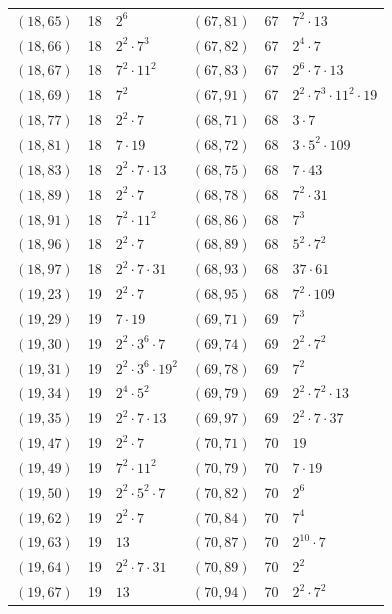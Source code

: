 \documentclass[11pt]{article}
\begin{document}
\begin{longtable}{@{}lrl@{\qquad}lrl@{}}
$(18,65)$ & 18 & $2^{6}$ & $(67,81)$ & 67 & $7^{2}\cdot 13$\\
$(18,66)$ & 18 & $2^{2}\cdot 7^{3}$ & $(67,82)$ & 67 & $2^{4}\cdot 7$\\
$(18,67)$ & 18 & $7^{2}\cdot 11^{2}$ & $(67,83)$ & 67 & $2^{6}\cdot 7\cdot 13$\\
$(18,69)$ & 18 & $7^{2}$ & $(67,91)$ & 67 & $2^{2}\cdot 7^{3}\cdot 11^{2}\cdot 19$\\
$(18,77)$ & 18 & $2^{2}\cdot 7$ & $(68,71)$ & 68 & $3\cdot 7$\\
$(18,81)$ & 18 & $7\cdot 19$ & $(68,72)$ & 68 & $3\cdot 5^{2}\cdot 109$\\
$(18,83)$ & 18 & $2^{2}\cdot 7\cdot 13$ & $(68,75)$ & 68 & $7\cdot 43$\\
$(18,89)$ & 18 & $2^{2}\cdot 7$ & $(68,78)$ & 68 & $7^{2}\cdot 31$\\
$(18,91)$ & 18 & $7^{2}\cdot 11^{2}$ & $(68,86)$ & 68 & $7^{3}$\\
$(18,96)$ & 18 & $2^{2}\cdot 7$ & $(68,89)$ & 68 & $5^{2}\cdot 7^{2}$\\
$(18,97)$ & 18 & $2^{2}\cdot 7\cdot 31$ & $(68,93)$ & 68 & $37\cdot 61$\\
$(19,23)$ & 19 & $2^{2}\cdot 7$ & $(68,95)$ & 68 & $7^{2}\cdot 109$\\
$(19,29)$ & 19 & $7\cdot 19$ & $(69,71)$ & 69 & $7^{3}$\\
$(19,30)$ & 19 & $2^{2}\cdot 3^{6}\cdot 7$ & $(69,74)$ & 69 & $2^{2}\cdot 7^{2}$\\
$(19,31)$ & 19 & $2^{2}\cdot 3^{6}\cdot 19^{2}$ & $(69,78)$ & 69 & $7^{2}$\\
$(19,34)$ & 19 & $2^{4}\cdot 5^{2}$ & $(69,79)$ & 69 & $2^{2}\cdot 7^{2}\cdot 13$\\
$(19,35)$ & 19 & $2^{2}\cdot 7\cdot 13$ & $(69,97)$ & 69 & $2^{2}\cdot 7\cdot 37$\\
$(19,47)$ & 19 & $2^{2}\cdot 7$ & $(70,71)$ & 70 & $19$\\
$(19,49)$ & 19 & $7^{2}\cdot 11^{2}$ & $(70,79)$ & 70 & $7\cdot 19$\\
$(19,50)$ & 19 & $2^{2}\cdot 5^{2}\cdot 7$ & $(70,82)$ & 70 & $2^{6}$\\
$(19,62)$ & 19 & $2^{2}\cdot 7$ & $(70,84)$ & 70 & $7^{4}$\\
$(19,63)$ & 19 & $13$ & $(70,87)$ & 70 & $2^{10}\cdot 7$\\
$(19,64)$ & 19 & $2^{2}\cdot 7\cdot 31$ & $(70,89)$ & 70 & $2^{2}$\\
$(19,67)$ & 19 & $13$ & $(70,94)$ & 70 & $2^{2}\cdot 7^{2}$\\

\end{longtable}
\end{document}
